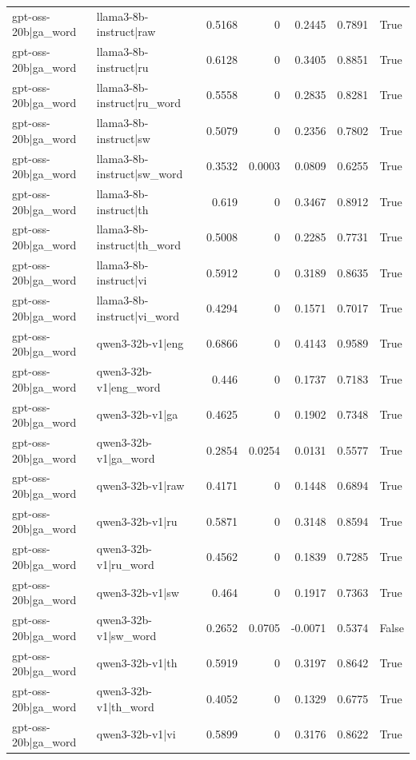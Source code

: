 \begin{table}
\begin{tabular}{l l r r r r l}
gpt-oss-20b|ga_word & llama3-8b-instruct|raw & 0.5168 & 0 & 0.2445 & 0.7891 & True \\
gpt-oss-20b|ga_word & llama3-8b-instruct|ru & 0.6128 & 0 & 0.3405 & 0.8851 & True \\
gpt-oss-20b|ga_word & llama3-8b-instruct|ru_word & 0.5558 & 0 & 0.2835 & 0.8281 & True \\
gpt-oss-20b|ga_word & llama3-8b-instruct|sw & 0.5079 & 0 & 0.2356 & 0.7802 & True \\
gpt-oss-20b|ga_word & llama3-8b-instruct|sw_word & 0.3532 & 0.0003 & 0.0809 & 0.6255 & True \\
gpt-oss-20b|ga_word & llama3-8b-instruct|th & 0.619 & 0 & 0.3467 & 0.8912 & True \\
gpt-oss-20b|ga_word & llama3-8b-instruct|th_word & 0.5008 & 0 & 0.2285 & 0.7731 & True \\
gpt-oss-20b|ga_word & llama3-8b-instruct|vi & 0.5912 & 0 & 0.3189 & 0.8635 & True \\
gpt-oss-20b|ga_word & llama3-8b-instruct|vi_word & 0.4294 & 0 & 0.1571 & 0.7017 & True \\
gpt-oss-20b|ga_word & qwen3-32b-v1|eng & 0.6866 & 0 & 0.4143 & 0.9589 & True \\
gpt-oss-20b|ga_word & qwen3-32b-v1|eng_word & 0.446 & 0 & 0.1737 & 0.7183 & True \\
gpt-oss-20b|ga_word & qwen3-32b-v1|ga & 0.4625 & 0 & 0.1902 & 0.7348 & True \\
gpt-oss-20b|ga_word & qwen3-32b-v1|ga_word & 0.2854 & 0.0254 & 0.0131 & 0.5577 & True \\
gpt-oss-20b|ga_word & qwen3-32b-v1|raw & 0.4171 & 0 & 0.1448 & 0.6894 & True \\
gpt-oss-20b|ga_word & qwen3-32b-v1|ru & 0.5871 & 0 & 0.3148 & 0.8594 & True \\
gpt-oss-20b|ga_word & qwen3-32b-v1|ru_word & 0.4562 & 0 & 0.1839 & 0.7285 & True \\
gpt-oss-20b|ga_word & qwen3-32b-v1|sw & 0.464 & 0 & 0.1917 & 0.7363 & True \\
gpt-oss-20b|ga_word & qwen3-32b-v1|sw_word & 0.2652 & 0.0705 & -0.0071 & 0.5374 & False \\
gpt-oss-20b|ga_word & qwen3-32b-v1|th & 0.5919 & 0 & 0.3197 & 0.8642 & True \\
gpt-oss-20b|ga_word & qwen3-32b-v1|th_word & 0.4052 & 0 & 0.1329 & 0.6775 & True \\
gpt-oss-20b|ga_word & qwen3-32b-v1|vi & 0.5899 & 0 & 0.3176 & 0.8622 & True \\

\end{tabular}
\end{table}

